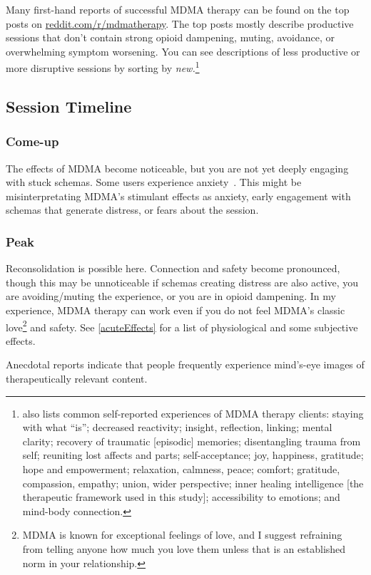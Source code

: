 \documentclass[11pt,oneside]{book}
\let\cite\parencite
\begin{document}
Many first-hand reports of successful MDMA therapy can be found on the top posts on \href{https://reddit.com/r/mdmatherapy/top/?sort=top&t=all}{reddit.com/r/mdmatherapy}. The top posts mostly describe productive sessions that don't contain strong opioid dampening, muting, avoidance, or overwhelming symptom worsening. You can see descriptions of less productive or more disruptive sessions by sorting by \textit{new.}\footnote{\textcite{godes2023perceived} also lists common self-reported experiences of MDMA therapy clients: staying with what \enquote{is}; decreased reactivity; insight, reflection, linking; mental clarity; recovery of traumatic [episodic] memories; disentangling trauma from self; reuniting lost affects and parts; self-acceptance; joy, happiness, gratitude; hope and empowerment; relaxation, calmness, peace; comfort; gratitude, compassion, empathy; union, wider perspective; inner healing intelligence [the therapeutic framework used in this study]; accessibility to emotions; and mind-body connection.}

\subsection*{Session Timeline}
\subsubsection*{Come-up}
The effects of MDMA become noticeable, but you are not yet deeply engaging with stuck schemas. Some users experience anxiety~\cite{hillsSolo}. This might be misinterpretating MDMA's stimulant effects as anxiety, early engagement with schemas that generate distress, or fears about the session.

\subsubsection*{Peak}
Reconsolidation is possible here. Connection and safety become pronounced, though this may be unnoticeable if schemas creating distress are also active, you are avoiding/muting the experience, or you are in opioid dampening. In my experience, MDMA therapy can work even if you do not feel MDMA's classic love\footnote{MDMA is known for exceptional feelings of love, and I suggest refraining from telling anyone how much you love them unless that is an established norm in your relationship.} and safety. See \cref{acuteEffects} for a list of physiological and some subjective effects.

Anecdotal reports indicate that people frequently experience mind's-eye images of therapeutically relevant content.
\end{document}
